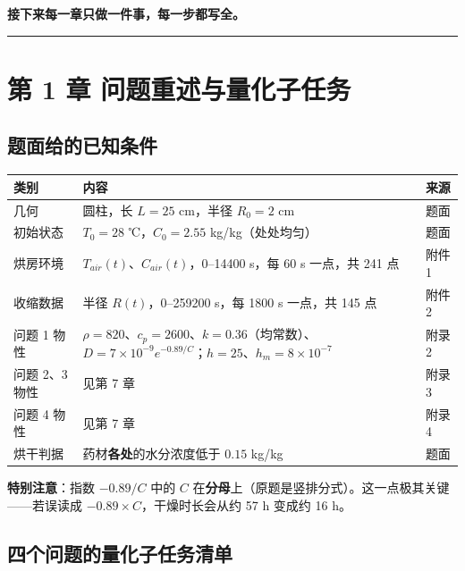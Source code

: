 \textbf{接下来每一章只做一件事，每一步都写全。}


\vspace{1mm}\hrule\vspace{1mm}


\section{第 1 章 问题重述与量化子任务}


\subsection{题面给的已知条件}


\begin{center}
\small
\begin{tabular}{lll}
\toprule
类别 & 内容 & 来源 \\
\midrule
几何 & 圆柱，长 $L=25$ cm，半径 $R_0=2$ cm & 题面 \\
初始状态 & $T_0=28$ ℃，$C_0=2.55$ kg/kg（处处均匀） & 题面 \\
烘房环境 & $T_{air}(t)$、$C_{air}(t)$，0–14400 s，每 60 s 一点，共 241 点 & 附件 1 \\
收缩数据 & 半径 $R(t)$，0–259200 s，每 1800 s 一点，共 145 点 & 附件 2 \\
问题 1 物性 & $\rho=820$、$c_p=2600$、$k=0.36$（均常数）、$D=7\times10^{-9}e^{-0.89/C}$；$h=25$、$h_m=8\times10^{-7}$ & 附录 2 \\
问题 2、3 物性 & 见第 7 章 & 附录 3 \\
问题 4 物性 & 见第 7 章 & 附录 4 \\
烘干判据 & 药材\textbf{各处}的水分浓度低于 $0.15$ kg/kg & 题面 \\
\bottomrule
\end{tabular}
\end{center}


\textbf{特别注意}：指数 $-0.89/C$ 中的 $C$ 在\textbf{分母}上（原题是竖排分式）。这一点极其关键——若误读成 $-0.89\times C$，干燥时长会从约 57 h 变成约 16 h。


\subsection{四个问题的量化子任务清单}


